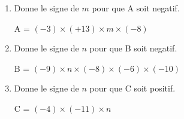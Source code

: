 \begin{exercice*}    
        \begin{enumerate}
            \item Donne le signe de $ m $ pour que A soit negatif.
            
            A = $ (-3) \times (+13)\times m\times (-8) $
            \item Donne le signe de $ n $ pour que B soit negatif. 
            
            B = $ (-9) \times n\times (-8)\times (-6)\times (-10) $ 
            \item Donne le signe de $ n $ pour que C soit positif. 
            
            C = $ (-4) \times (-11)\times n $
        \end{enumerate}

\end{exercice*}
